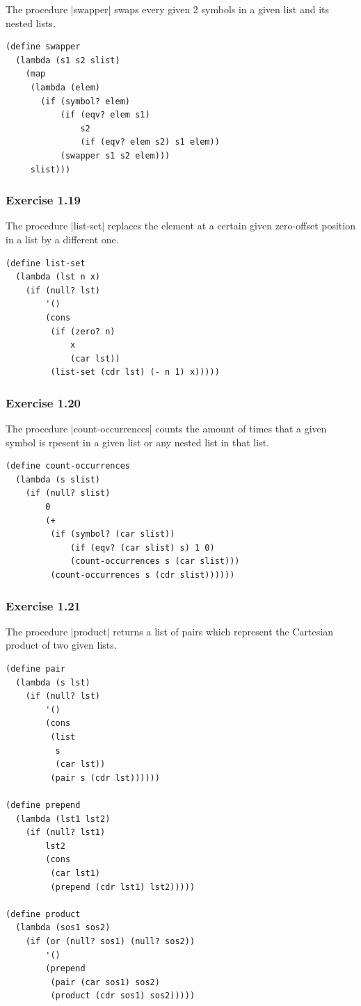 \documentclass[a4paper]{article}
\begin{document}
The procedure |swapper| swaps every given 2 symbols in a given list and its nested lists.

\begin{lstlisting}
(define swapper
  (lambda (s1 s2 slist)
    (map
     (lambda (elem)
       (if (symbol? elem)
           (if (eqv? elem s1)
               s2
               (if (eqv? elem s2) s1 elem))
           (swapper s1 s2 elem)))
     slist)))
\end{lstlisting}

\subsubsection{Exercise 1.19}

The procedure |list-set| replaces the element at a certain given zero-offset position in a list by a different one.

\begin{lstlisting}
(define list-set
  (lambda (lst n x)
    (if (null? lst)
        '()
        (cons
         (if (zero? n)
             x
             (car lst))
         (list-set (cdr lst) (- n 1) x)))))
\end{lstlisting}

\subsubsection{Exercise 1.20}

The procedure |count-occurrences| counts the amount of times that a given symbol is rpesent in a given list or any nested list in that list.

\begin{lstlisting}
(define count-occurrences
  (lambda (s slist)
    (if (null? slist)
        0
        (+
         (if (symbol? (car slist))
             (if (eqv? (car slist) s) 1 0)
             (count-occurrences s (car slist)))
         (count-occurrences s (cdr slist))))))
\end{lstlisting}

\subsubsection{Exercise 1.21}

The procedure |product| returns a list of pairs which represent the Cartesian product of two given lists.

\begin{lstlisting}
(define pair
  (lambda (s lst)
    (if (null? lst)
        '()
        (cons
         (list
          s
          (car lst))
         (pair s (cdr lst))))))

(define prepend
  (lambda (lst1 lst2)
    (if (null? lst1)
        lst2
        (cons
         (car lst1)
         (prepend (cdr lst1) lst2)))))

(define product
  (lambda (sos1 sos2)
    (if (or (null? sos1) (null? sos2))
        '()
        (prepend
         (pair (car sos1) sos2)
         (product (cdr sos1) sos2)))))
\end{lstlisting}
\end{document}
